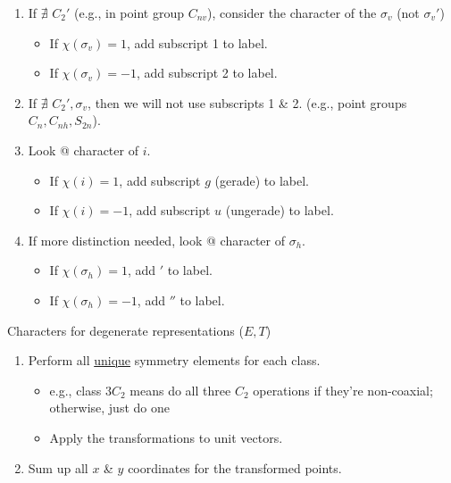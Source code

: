 \documentclass[10pt,landscape]{article}
\begin{document}
\begin{multicols}{3}
\begin{enumerate}
	\item If $\nexists$ $C_2'$ (e.g., in point group $C_{nv}$), consider the character of the $\sigma_v$ (not $\sigma_v'$)
	\begin{itemize}
		\item If $\chi(\sigma_v)=1$, add subscript 1 to label.
		\item If $\chi(\sigma_v)=-1$, add subscript 2 to label.
	\end{itemize}

	\item If $\nexists$ $C_2', \sigma_v$, then we will not use subscripts 1 \& 2. (e.g., point groups $C_n, C_{nh}, S_{2n}$).
	
	\item Look @ character of $i$.
	\begin{itemize}
		\item If $\chi(i)=1$, add subscript $g$ (gerade) to label.
		\item If $\chi(i)=-1$, add subscript $u$ (ungerade) to label.
	\end{itemize}

	\item If more distinction needed, look @ character of $\sigma_h$.
	\begin{itemize}
		\item If $\chi(\sigma_h)=1$, add $'$ to label.
		\item If $\chi(\sigma_h)=-1$, add $''$ to label.
	\end{itemize}
\end{enumerate}

Characters for degenerate representations ($E, T$)
\begin{enumerate}
	\item Perform all \underline{unique} symmetry elements for each class.
	\begin{itemize}
		\item e.g., class $3C_2$ means do all three $C_2$ operations if they're non-coaxial; otherwise, just do one
		\item Apply the transformations to unit vectors.
	\end{itemize}
	\item Sum up all $x$ \& $y$ coordinates for the transformed points.
\end{enumerate}


\end{multicols}
\end{document}
